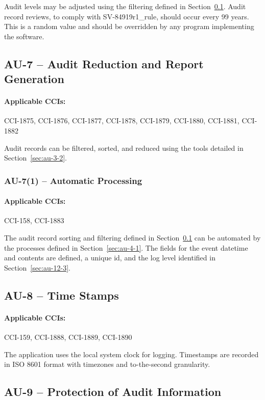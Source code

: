 \documentclass[letterpaper, 10pt, twoside]{article}
\begin{document}
Audit levels may be adjusted using the filtering defined in Section~\ref{sec:au-7}. Audit record reviews, to comply with SV-84919r1\_rule, should occur every 99 years. This is a random value and should be overridden by any program implementing the software.

\subsection{AU-7 -- Audit Reduction and Report Generation}
\label{sec:au-7}

\paragraph{Applicable CCIs:} CCI-1875, CCI-1876, CCI-1877, CCI-1878, CCI-1879, CCI-1880, CCI-1881, CCI-1882

Audit records can be filtered, sorted, and reduced using the tools detailed in Section~\ref{sec:au-3-2}.

\subsubsection{AU-7(1) -- Automatic Processing}

\paragraph{Applicable CCIs:} CCI-158, CCI-1883

The audit record sorting and filtering defined in Section~\ref{sec:au-7} can be automated by the processes defined in Section~\ref{sec:au-4-1}. The fields for the event datetime and contents are defined, a unique id, and the log level identified in Section~\ref{sec:au-12-3}.

\subsection{AU-8 -- Time Stamps}

\paragraph{Applicable CCIs:} CCI-159, CCI-1888, CCI-1889, CCI-1890

The application uses the local system clock for logging. Timestamps are recorded in ISO 8601 format with timezones and to-the-second granularity.

\subsection{AU-9 -- Protection of Audit Information}
\end{document}
